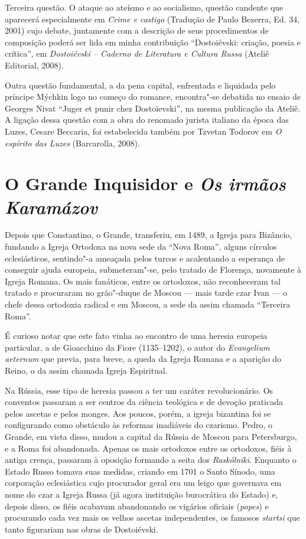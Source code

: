 Terceira questão. O ataque ao ateísmo e ao socialismo, questão candente que aparecerá
especialmente em \emph{Crime e castigo} (Tradução de Paulo Bezerra,
Ed. 34, 2001) cujo debate, juntamente com a descrição de seus
procedimentos de composição poderá ser lida em minha contribuição 
``Dostoiévski: criação, poesia e crítica'', em \emph{Dostoiévski -- Caderno
de Literatura e Cultura Russa} (Ateliê Editorial, 2008).

Outra questão fundamental, a da pena capital, enfrentada e liquidada
pelo príncipe Mýchkin logo no começo do romance, encontra"-se debatida no
ensaio de Georges Nivat ``Juger et punir chez Dostoïevski'', na mesma
publicação da Ateliê. A ligação dessa questão com a obra do renomado
jurista italiano da época das Luzes, Cesare Beccaria, foi estabelecida
também por Tzvetan Todorov em \emph{O espírito das Luzes} (Barcarolla,
2008).

\chapter{O Grande Inquisidor e \emph{Os irmãos Karamázov}}

Depois que Constantino, o Grande, transferiu, em 1489, a Igreja para
Bizâncio, fundando a Igreja Ortodoxa na nova sede da ``Nova Roma'',
alguns círculos eclesiásticos, sentindo"-a ameaçada pelos turcos e
acalentando a esperança de conseguir ajuda europeia, submeteram"-se, pelo
tratado de Florença, novamente à Igreja Romana. Os mais fanáticos, entre
os ortodoxos, não reconheceram tal tratado e procuraram no grão"-duque de
Moscou --- mais tarde czar Ivan  --- o chefe dessa ortodoxia radical e
em Moscou, a sede da assim chamada ``Terceira Roma''.

É curioso notar que este fato vinha ao encontro de uma heresia europeia
particular, a de Gioacchino da Fiore (1135--1202), o autor do
\emph{Evangelium aeternum} que previa, para breve, a queda da Igreja
Romana e a aparição do  Reino, o da assim chamada Igreja Espiritual.

Na Rússia, esse tipo de heresia passou a ter um caráter revolucionário.
Os conventos passaram a ser centros da ciência teológica e de devoção
praticada pelos ascetas e pelos monges. Aos poucos, porém, a igreja
bizantina foi se configurando como obstáculo às reformas inadiáveis do
czarismo. Pedro, o Grande, em vista disso, mudou a capital da Rússia de
Moscou para Petersburgo, e a  Roma foi abandonada. Apenas os mais
ortodoxos entre os ortodoxos, fiéis à antiga crença, passaram à oposição
formando a seita dos \emph{Raskólniki}. Enquanto o Estado Russo tomava
suas medidas, criando em 1701 o Santo Sínodo, uma corporação
eclesiástica cujo procurador geral era um leigo que governava em nome do
czar a Igreja Russa (já agora instituição burocrática do Estado) e,
depois disso, os fiéis acabavam abandonando os vigários oficiais
(\emph{popes}) e procurando cada vez mais os velhos ascetas
independentes, os famosos \emph{startsi} que tanto figurariam nas obras
de Dostoiévski.

